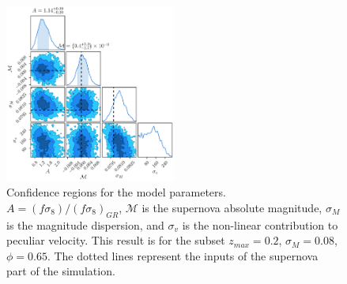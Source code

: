 \documentclass{aastex62}   	%
\begin{document}
\begin{figure}
\centering
\includegraphics[width=0.5\textwidth]{../outcosmo/pvlist.0.08.1234.0.65.0.2.pkl.png}
\caption{Confidence regions for the model parameters.  $A=(f\sigma_8)/(f\sigma_8)_{GR}$, $\mathcal{M}$ is the supernova
absolute magnitude, $\sigma_M$ is the magnitude dispersion, and $\sigma_v$ is the non-linear contribution
to peculiar velocity.  This result is for the subset $z_{max}=0.2$, $\sigma_M=0.08$, $\phi=0.65$.  The dotted lines represent the inputs of the supernova
part of the simulation.
\label{zmax:fig}}
\end{figure}
\end{document}
